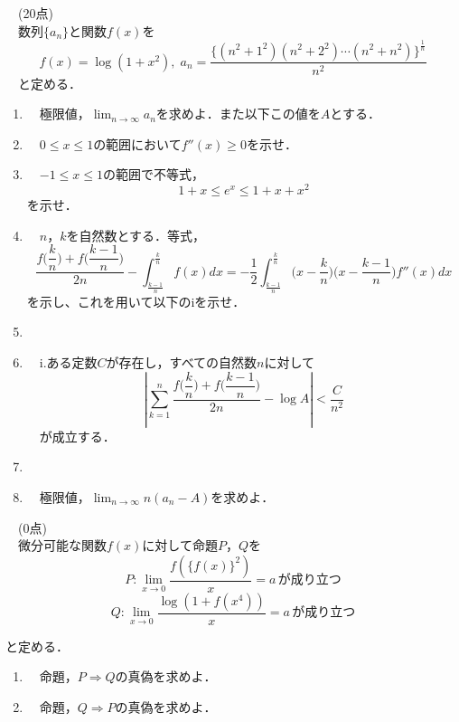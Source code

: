 \documentclass[a4paper]{ltjsarticle}
\begin{document}



\fontsize{14truept}{14truept}\selectfont

\white\white{}\noindent
{}　\;(20点)
\\[5mm]\indent
　数列$\{a_n\}$と関数$f(x)$を
\[f(x)=\log(1+x^2), \;a_n=\dfrac{\{(n^2+1^2)(n^2+2^2)\cdots(n^2+n^2)\}^{\frac{1}{n}}}{n^2}\]
　と定める．\\[5mm]
\begin{enumerate}
\item[(1)]　極限値，$\displaystyle\lim_{n\rightarrow\infty}a_n$を求めよ．また以下この値を$A$とする．
\item[(2)]　$0\leq{x}\leq{1}$の範囲において$f''(x)\geq{0}$を示せ．
\item[(3)]　$-1\leq{x}\leq{1}$の範囲で不等式，
\[1+x\leq{e^x}\leq{1+x+x^2}\]
を示せ．
\item[(4)]　$n$，$k$を自然数とする．等式，
\[\dfrac{f\bigg(\dfrac{k}{n}\bigg)+f \bigg(\dfrac{k-1}{n}\bigg)}{2n}-\displaystyle\int_{\frac{k-1}{n}}^{\frac{k}{n}}f(x)dx=-\dfrac{1}{2}\displaystyle\int_{\frac{k-1}{n}}^{\frac{k}{n}}\bigg(x-\dfrac{k}{n}\bigg)\bigg(x-\dfrac{k-1}{n}\bigg)f''(x)dx\]
を示し、これを用いて以下のiを示せ．
\item[]
\item[]　i.\;\;ある定数$C$が存在し，すべての自然数$n$に対して
\[\left\lvert\displaystyle\sum_{k=1}^n\dfrac{f \bigg(\dfrac{k}{n}\bigg)+f \bigg(\dfrac{k-1}{n}\bigg)}{2n}-\log{A}\right\rvert<\dfrac{C}{n^2}\]
　が成立する．
\item[]
\item[(4)]　極限値，$\displaystyle\lim_{n\rightarrow\infty}n(a_n-A)$を求めよ．
\end{enumerate}








\newpage\noindent
{}　\;(0点)
\\[5mm]\indent
　微分可能な関数$f(x)$に対して命題$P$，$Q$を
\[P:\displaystyle\lim_{x\rightarrow{0}}\dfrac{f(\{f(x)\}^2)}{x}=a\,が成り立つ\]
\[Q:\displaystyle\lim_{x\rightarrow{0}}\dfrac{\log{(1+f(x^4))}}{x}=a\,が成り立つ\]





と定める．
\begin{enumerate}
\item[(1)]　命題，$P\Rightarrow{Q}$の真偽を求めよ．
\item[(2)]　命題，$Q\Rightarrow{P}$の真偽を求めよ．
\end{enumerate}
\end{document}
